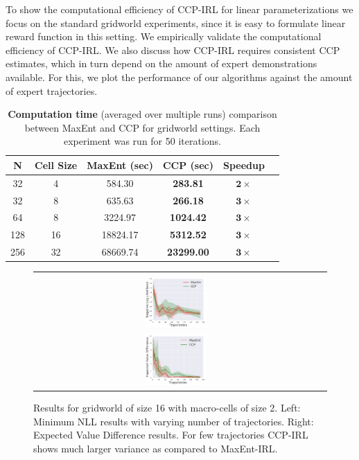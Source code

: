 \documentclass{article}
\def\MSHangBox#1{%
\begin{minipage}[t]{\textwidth}%
\begin{tabbing} %
~\\[-\baselineskip] %
#1 %
\end{tabbing}%
\end{minipage}} %
\begin{document}
To show the computational efficiency of CCP-IRL for linear parameterizations we focus on the standard gridworld experiments, since it is easy to formulate linear reward function in this setting. We empirically validate the computational efficiency of CCP-IRL. We also discuss how CCP-IRL requires consistent CCP estimates, which in turn depend on the amount of expert demonstrations available. For this, we plot the performance of our algorithms against the amount of expert trajectories. 
\begin{table}[t]
\centering
\def\arraystretch{1.0}%
\begin{tabular}{|c|c|c|c|c|c|}
\hline
N & Cell Size & MaxEnt (sec) & CCP (sec) & Speedup \\\hline

32 & 4 & 584.30 & \textbf{283.81} & $\mathbf{2}\times$ \\
32 & 8 & 635.63 & \textbf{266.18} & $\mathbf{3}\times$ \\
64 & 8 & 3224.97 & \textbf{1024.42} & $\mathbf{3}\times$ \\
128 & 16 & 18824.17 & \textbf{5312.52} & $\mathbf{3}\times$ \\
256 & 32 & 68669.74 & \textbf{23299.00} & $\mathbf{3}\times$ \\
\hline
\end{tabular}
\caption{\textbf{Computation time} (averaged over multiple runs) comparison between MaxEnt and CCP for gridworld settings. Each experiment was run for 50 iterations.}
\label{table:table_results_macro_cells}
\end{table}



\begin{figure}[t]
\centering
  \begin{tabular}{cc}
    \MSHangBox{\includegraphics[width=0.22\textwidth]{images/gridworld/macro_cells/grid_16_macro_2_lr_05/ll_ccp_vs_maxent_per_traj.pdf}}&
    \MSHangBox{\includegraphics[width=0.22\textwidth]{images/gridworld/macro_cells/grid_16_macro_2_lr_05/evd_multiple_tries.pdf}}
    \end{tabular}
    \caption{Results for gridworld of size 16 with macro-cells of size 2. Left: Minimum NLL results with varying number of trajectories. Right: Expected Value Difference results. For few trajectories CCP-IRL shows much larger variance as compared to MaxEnt-IRL.}
    \label{fig:img_maxent_vs_ccp_gridworld_macro_cell}
\end{figure}
\end{document}
